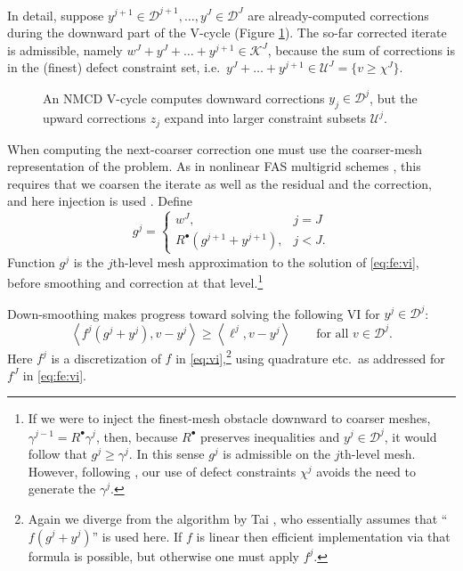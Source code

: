 \documentclass[letterpaper,final,12pt,reqno]{amsart}
\theoremstyle{cstyle}
\theoremstyle{cstyle*}
\theoremstyle{dstyle}
\numberwithin{equation}{section}
\numberwithin{figure}{section}
\numberwithin{table}{section}
\numberwithin{theorem}{section}
\newcommand{\ip}[2]{\left<#1,#2\right>}
\newcommand{\iR}{R^{\bullet}}
\begin{document}
In detail, suppose $y^{j+1} \in \mathcal{D}^{j+1}, \dots, y^J \in \mathcal{D}^J$ are already-computed corrections during the downward part of the V-cycle (Figure \ref{fig:nmcdvcycle}).  The so-far corrected iterate is admissible, namely $w^J + y^J + \dots + y^{j+1} \in \mathcal{K}^J$, because the sum of corrections is in the (finest) defect constraint set, i.e.~$y^J + \dots + y^{j+1} \in \mathcal{U}^J = \{v\ge \chi^J\}$.

\begin{figure}[h]
\begin{center}

\end{center}
\caption{An NMCD V-cycle computes downward corrections $y_j \in \mathcal{D}^j$, but the upward corrections $z_j$ expand into larger constraint subsets $\mathcal{U}^j$.}
\label{fig:nmcdvcycle}
\end{figure}

When computing the next-coarser correction one must use the coarser-mesh representation of the problem.  As in nonlinear FAS multigrid schemes \cite{BrandtLivne2011,Bruneetal2015,Trottenbergetal2001}, this requires that we coarsen the iterate as well as the residual and the correction, and here injection is used \cite[section 5.3]{Trottenbergetal2001}.  Define
\begin{equation}
g^j = \begin{cases} w^J, & j=J \\
                    \iR(g^{j+1} + y^{j+1}), & j < J.
      \end{cases}  \label{eq:fe:defineg}
\end{equation}
Function $g^j$ is the $j$th-level mesh approximation to the solution of \eqref{eq:fe:vi}, before smoothing and correction at that level.\footnote{If we were to inject the finest-mesh obstacle downward to coarser meshes, $\gamma^{j-1} = \iR \gamma^j$, then, because $\iR$ preserves inequalities and $y^j \in \mathcal{D}^j$, it would follow that $g^j \ge \gamma^j$.  In this sense $g^j$ is admissible on the $j$th-level mesh.  However, following \cite{GraeserKornhuber2009}, our use of defect constraints $\chi^j$ avoids the need to generate the $\gamma^j$.}

Down-smoothing makes progress toward solving the following VI for $y^j \in \mathcal{D}^j$:
\begin{equation}
\ip{f^j(g^j + y^j)}{v-y^j} \ge \ip{\ell^j}{v-y^j} \qquad \text{for all } v\in \mathcal{D}^j. \label{eq:fe:downvi}
\end{equation}
Here $f^j$ is a discretization of $f$ in \eqref{eq:vi},\footnote{Again we diverge from the algorithm by Tai \cite{Tai2003}, who essentially assumes that ``$f(g^j + y^j)$'' is used here.  If $f$ is linear then efficient implementation via that formula is possible, but otherwise one must apply $f^j$.} using quadrature etc.~as addressed for $f^J$ in \eqref{eq:fe:vi}.
\end{document}
